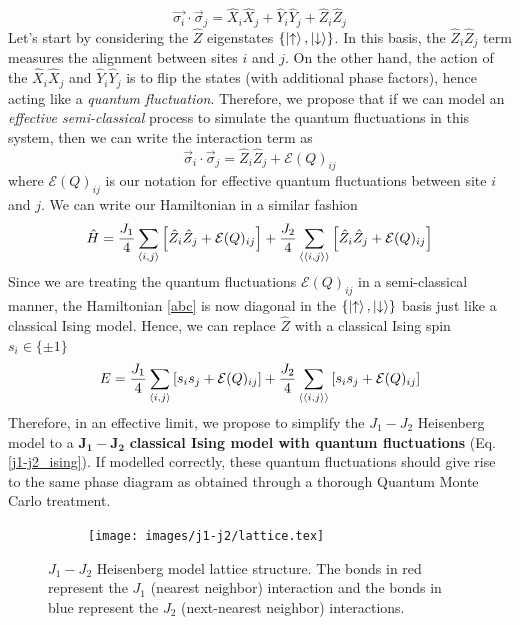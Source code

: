 \documentclass[../thesis_main.tex]{subfiles}
\begin{document}
\begin{equation}
    \vec{\sigma_i} \cdot \vec{\sigma}_j = \hat{X}_i \hat{X}_j + \hat{Y}_i \hat{Y}_j + \hat{Z}_i \hat{Z}_j
\end{equation}
Let's start by considering the $\hat{Z}$ eigenstates $\{\ket{\uparrow}, \ket{\downarrow}\}$. In this basis, the $\hat{Z}_i \hat{Z}_j$ term measures the alignment between sites $i$ and $j$. On the other hand, the action of the $\hat{X}_i \hat{X}_j$ and $\hat{Y}_i \hat{Y}_j$ is to flip the states (with additional phase factors), hence acting like a \textit{quantum fluctuation}. Therefore, we propose that if we can model an \textit{effective semi-classical} process to simulate the quantum fluctuations in this system, then we can write the interaction term as 
\begin{equation}
    \vec{\sigma}_i \cdot \vec{\sigma}_j = \hat{Z}_i \hat{Z}_j + \mathcal{E}(Q)_{ij}
\end{equation}
where $\mathcal{E}(Q)_{ij}$ is our notation for effective quantum fluctuations between site $i$ and $j$. We can write our Hamiltonian in a similar fashion
\begin{equation}
    \hat{H} = \frac{J_1}{4} \sum_{\expval{i,j}} \qty[\hat{Z}_i \hat{Z}_j + \mathcal{E}(Q)_{ij}] + \frac{J_2}{4} \sum_{\expval{\expval{i,j}}} \qty[\hat{Z}_i \hat{Z}_j + \mathcal{E}(Q)_{ij}]
    \label{abc}
\end{equation}
Since we are treating the quantum fluctuations $\mathcal{E}(Q)_{ij}$ in a semi-classical manner, the Hamiltonian \eqref{abc} is now diagonal in the $\{\ket{\uparrow}, \ket{\downarrow} \}$ basis just like a classical Ising model. Hence, we can replace $\hat{Z}$ with a classical Ising spin $s_i \in \{\pm 1\}$  
\begin{equation}
    E = \frac{J_1}{4} \sum_{\expval{i,j}} \qty[s_i s_j + \mathcal{E}(Q)_{ij}] + \frac{J_2}{4} \sum_{\expval{\expval{i,j}}} \qty[s_i s_j + \mathcal{E}(Q)_{ij}]
    \label{j1-j2_ising}
\end{equation}
Therefore, in an effective limit, we propose to simplify the $J_1 - J_2$ Heisenberg model to a $\boldsymbol{J_1 - J_2}$ \textbf{classical Ising model with quantum fluctuations} (Eq. \eqref{j1-j2_ising}). If modelled correctly, these quantum fluctuations should give rise to the same phase diagram as obtained through a thorough Quantum Monte Carlo treatment.
\begin{figure}[t!]
    \centering
    \begin{subfigure}[b]{0.7\textwidth}  %
        \centering
        \texttt{[image: images/j1-j2/lattice.tex]}
    \end{subfigure}
    \caption{ $J_1-J_2$ Heisenberg model lattice structure. The bonds in red represent the $J_1$ (nearest neighbor) interaction and the bonds in blue represent the $J_2$ (next-nearest neighbor) interactions.}
    \label{lattice}
\end{figure}
\end{document}
